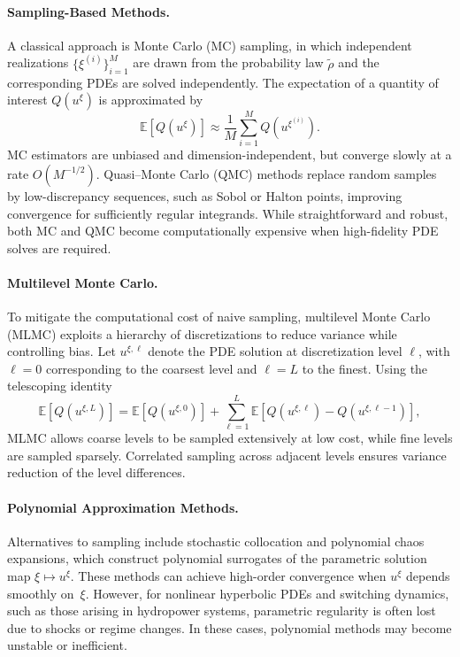 \documentclass{article}
\newcommand{\1}{\mathds{1}}          %
\theoremstyle{definition}
\begin{document}
\begin{sloppypar}
\paragraph{Sampling-Based Methods.}
A classical approach is Monte Carlo (MC) sampling, in which independent realizations
$\{\xi^{(i)}\}_{i=1}^M$ are drawn from the probability law $\tilde{\rho}$ and the
corresponding PDEs are solved independently. The expectation of a quantity of
interest $Q(u^\xi)$ is approximated by
\[
\mathbb{E}[Q(u^\xi)] \approx \frac{1}{M}
\sum_{i=1}^M Q\!\left(u^{\xi^{(i)}}\right).
\]
MC estimators are unbiased and dimension-independent, but converge slowly at a rate
$O(M^{-1/2})$. Quasi–Monte Carlo (QMC) methods replace random samples by
low-discrepancy sequences, such as Sobol or Halton points, improving convergence for
sufficiently regular integrands. While straightforward and robust, both MC and QMC
become computationally expensive when high-fidelity PDE solves are required.

\paragraph{Multilevel Monte Carlo.}
To mitigate the computational cost of naive sampling, multilevel Monte Carlo (MLMC)
exploits a hierarchy of discretizations to reduce variance while controlling bias.
Let $u^{\xi,\ell}$ denote the PDE solution at discretization level $\ell$, with
$\ell=0$ corresponding to the coarsest level and $\ell=L$ to the finest.
Using the telescoping identity
\[
\mathbb{E}[Q(u^{\xi,L})]
= \mathbb{E}[Q(u^{\xi,0})]
+ \sum_{\ell=1}^L
  \mathbb{E}\!\left[
    Q(u^{\xi,\ell}) - Q(u^{\xi,\ell-1})
  \right],
\]
MLMC allows coarse levels to be sampled extensively at low cost, while fine levels
are sampled sparsely. Correlated sampling across adjacent levels ensures variance
reduction of the level differences.

\paragraph{Polynomial Approximation Methods.}
Alternatives to sampling include stochastic collocation and polynomial chaos
expansions, which construct polynomial surrogates of the parametric solution map
$\xi \mapsto u^\xi$. These methods can achieve high-order convergence when
$u^\xi$ depends smoothly on~$\xi$. However, for nonlinear hyperbolic PDEs and
switching dynamics, such as those arising in hydropower systems, parametric
regularity is often lost due to shocks or regime changes. In these cases,
polynomial methods may become unstable or inefficient.


\end{sloppypar}
\end{document}
